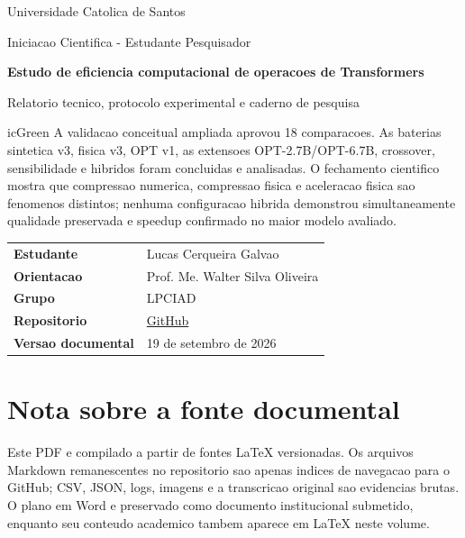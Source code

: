 \documentclass[12pt,a4paper,oneside]{report}
\begin{document}
\begin{titlepage}
  \thispagestyle{empty}
  \sffamily
  \noindent{\color{icBlue}\rule{\linewidth}{4pt}}
  \vspace{1.8cm}

  {\Large\color{icMuted}Universidade Catolica de Santos\par}
  \vspace{0.35cm}
  {\large\color{icMuted}Iniciacao Cientifica - Estudante Pesquisador\par}

  \vfill
  {\fontsize{28}{33}\selectfont\bfseries\color{icNavy}
    Estudo de eficiencia computacional de operacoes de Transformers\par}
  \vspace{0.7cm}
  {\Large\color{icBlue}
    Relatorio tecnico, protocolo experimental e caderno de pesquisa\par}
  \vspace{1.2cm}

  \begin{icstatus}{icGreen}
    A validacao conceitual ampliada aprovou 18 comparacoes. As baterias
    sintetica v3, fisica v3, OPT v1, as extensoes OPT-2.7B/OPT-6.7B,
    crossover, sensibilidade e hibridos foram concluidas e analisadas. O
    fechamento cientifico mostra que compressao numerica, compressao fisica e
    aceleracao fisica sao fenomenos distintos; nenhuma configuracao hibrida
    demonstrou simultaneamente qualidade preservada e speedup confirmado no
    maior modelo avaliado.
  \end{icstatus}

  \vfill
  \begin{tabular}{@{}ll@{}}
    \textbf{Estudante} & Lucas Cerqueira Galvao \\
    \textbf{Orientacao} & Prof. Me. Walter Silva Oliveira \\
    \textbf{Grupo} & LPCIAD \\
    \textbf{Repositorio} & \href{https://github.com/LucasCerqueiraGalvao/scientific-initiation}{GitHub} \\
    \textbf{Versao documental} & 19 de setembro de 2026
  \end{tabular}

  \vspace{1.4cm}
  \noindent{\color{icBlue}\rule{\linewidth}{1.2pt}}
\end{titlepage}

\chapter*{Nota sobre a fonte documental}
Este PDF e compilado a partir de fontes LaTeX versionadas. Os arquivos Markdown
remanescentes no repositorio sao apenas indices de navegacao para o GitHub; CSV,
JSON, logs, imagens e a transcricao original sao evidencias brutas. O plano em
Word e preservado como documento institucional submetido, enquanto seu conteudo
academico tambem aparece em LaTeX neste volume.
\end{document}
